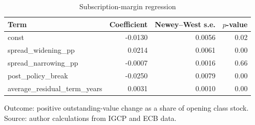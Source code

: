 \begin{table}[H]
\centering
\caption{Subscription-margin regression}
\label{tab:repricing-estimation}
\begin{tabular}{lrrr}
\toprule
Term & Coefficient & Newey--West s.e. & $p$-value \\
\midrule
const & -0.0130 & 0.0056 & 0.02 \\
spread\_widening\_pp & 0.0214 & 0.0061 & 0.00 \\
spread\_narrowing\_pp & -0.0007 & 0.0016 & 0.66 \\
post\_policy\_break & -0.0250 & 0.0079 & 0.00 \\
average\_residual\_term\_years & 0.0031 & 0.0010 & 0.00 \\
\bottomrule
\end{tabular}
\par\smallskip
\parbox{0.92\textwidth}{\small Outcome: positive outstanding-value change as a share of opening class stock. Source: author calculations from IGCP and ECB data.}
\end{table}
